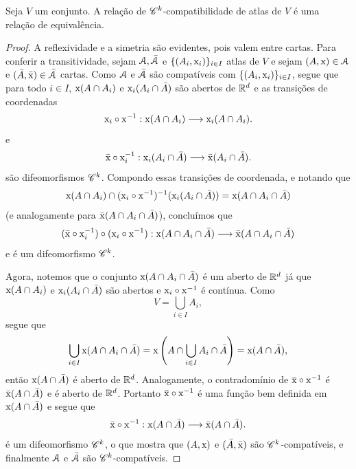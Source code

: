 \begin{prop}
Seja $V$ um conjunto. A relação de $\mathscr{C}^k$-compatibilidade de atlas de $V$ é uma relação de equivalência.
\end{prop}
\begin{proof}
A reflexividade e a simetria são evidentes, pois valem entre cartas. Para conferir a transitividade, sejam $\mathcal{A},\bar{\mathcal{A}}$ e $\{(A_i,\mathrm{x}_i)\}_{i \in I}$ atlas de $V$ e sejam $(A,\mathrm{x}) \in \mathcal{A}$ e $(\bar A,\bar{\mathrm{x}}) \in \bar{\mathcal{A}}$ cartas. 
Como $\mathcal{A}$ e $\bar{\mathcal{A}}$ são compatíveis com $\{(A_i,\mathrm{x}_i)\}_{i \in I}$, segue que para todo $i \in I$, $\mathrm{x}(A \cap A_i)$ e $\mathrm{x}_i(A_i \cap \bar A)$ são abertos de $\mathbb{R}^d$ e as transições de coordenadas
	\begin{equation*}
	\mathrm{x}_i \circ \mathrm{x}^{-1}: \mathrm{x}(A \cap A_i) \longrightarrow \mathrm{x}_i(A \cap A_i).
	\end{equation*}
e
	\begin{equation*}
	\bar{\mathrm{x}} \circ \mathrm{x}_i^{-1}: \mathrm{x}_i(A_i \cap \bar A) \longrightarrow \bar{\mathrm{x}}(A_i \cap \bar A).
	\end{equation*}
são difeomorfismos $\mathscr{C}^k$. Compondo essas transições de coordenada, e notando que
	\begin{equation*}
	\mathrm{x}(A \cap A_i) \cap (\mathrm{x}_i \circ \mathrm{x}^{-1})^{-1}(\mathrm{x}_i(A_i \cap \bar A)) = \mathrm{x}(A \cap A_i \cap \bar A)
	\end{equation*}
(e analogamente para $\bar{\mathrm{x}}(A \cap A_i \cap \bar A)$), concluímos que
	\begin{equation*}
	(\bar{\mathrm{x}} \circ \mathrm{x}_i^{-1}) \circ (\mathrm{x}_i \circ \mathrm{x}^{-1}): \mathrm{x}(A \cap A_i \cap \bar A) \longrightarrow \bar{\mathrm{x}}(A \cap A_i \cap \bar A)
	\end{equation*}
e é um difeomorfismo $\mathscr{C}^k$. 

Agora, notemos que o conjunto $\mathrm{x}(A \cap A_i \cap \bar A)$ é um aberto de $\mathbb{R}^d$ já que $\mathrm{x}(A \cap A_i)$ e $\mathrm{x}_i(A_i \cap \bar A)$ são abertos e $\mathrm{x}_i \circ \mathrm{x}^{-1}$ é contínua. Como
	\begin{equation*}
	V= \bigcup_{i \in I} A_i,
	\end{equation*}
segue que
	\begin{equation*}
	\bigcup_{i \in I} \mathrm{x}(A \cap A_i \cap \bar A) = \mathrm{x}\left(A \cap \bigcup_{i \in I} A_i \cap \bar A\right) = \mathrm{x}(A \cap \bar A),
	\end{equation*}
então $\mathrm{x}(A \cap \bar A)$ é aberto de $\mathbb{R}^d$. Analogamente, o contradomínio de $\bar{\mathrm{x}} \circ \mathrm{x}^{-1}$ é $\bar{\mathrm{x}}(A \cap \bar A)$ e é aberto de $\mathbb{R}^d$. Portanto $\bar{\mathrm{x}} \circ \mathrm{x}^{-1}$ é uma função bem definida em $\mathrm{x}(A \cap \bar A)$ e segue que
	\begin{equation*}
	\bar{\mathrm{x}} \circ \mathrm{x}^{-1}: \mathrm{x}(A \cap \bar A) \longrightarrow \bar{\mathrm{x}}(A \cap \bar A).
	\end{equation*}
é um difeomorfismo $\mathscr{C}^k$, o que mostra que $(A,\mathrm{x})$ e $(\bar A,\bar{\mathrm{x}})$ são $\mathscr{C}^k$-compatíveis, e finalmente $\mathcal{A}$ e $\bar{\mathcal{A}}$ são $\mathscr{C}^k$-compatíveis.
\end{proof}

